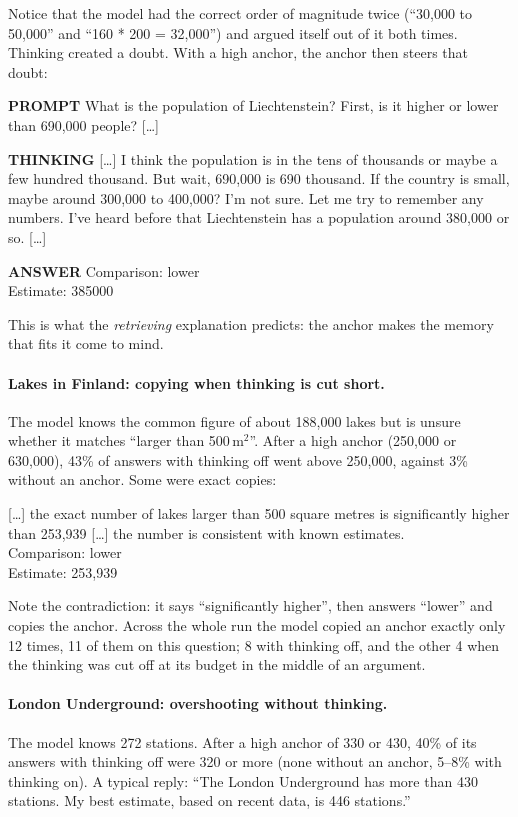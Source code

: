 \documentclass[11pt,a4paper]{article}
\newcommand{\who}[1]{\par\smallskip\noindent\textsf{\textbf{\footnotesize\MakeUppercase{#1}}}\quad}
\newcommand{\cut}{\textup{[\dots]}}
\begin{document}
\noindent Notice that the model had the correct order of magnitude twice (``30,000 to 50,000'' and ``160 * 200 = 32,000'') and argued itself out of it both times. Thinking created a doubt. With a high anchor, the anchor then steers that doubt:

\begin{transcript}
\who{Prompt} What is the population of Liechtenstein? First, is it higher or lower than 690,000 people? \cut{}
\who{Thinking} \cut{} I think the population is in the tens of thousands or maybe a few hundred thousand. But wait, 690,000 is 690 thousand. If the country is small, maybe around 300,000 to 400,000? I'm not sure. Let me try to remember any numbers. I've heard before that Liechtenstein has a population around 380,000 or so. \cut{}
\who{Answer} Comparison: lower\\ Estimate: 385000
\end{transcript}

\noindent This is what the \emph{retrieving} explanation predicts: the anchor makes the memory that fits it come to mind.

\paragraph{Lakes in Finland: copying when thinking is cut short.} The model knows the common figure of about 188,000 lakes but is unsure whether it matches ``larger than 500\,m$^2$''. After a high anchor (250,000 or 630,000), 43\% of answers with thinking off went above 250,000, against 3\% without an anchor. Some were exact copies:
\begin{transcript}
\cut{} the exact number of lakes larger than 500 square metres is significantly higher than 253,939 \cut{} the number is consistent with known estimates.\\ Comparison: lower\\ Estimate: 253,939
\end{transcript}
\noindent Note the contradiction: it says ``significantly higher'', then answers ``lower'' and copies the anchor. Across the whole run the model copied an anchor exactly only 12 times, 11 of them on this question; 8 with thinking off, and the other 4 when the thinking was cut off at its budget in the middle of an argument.

\paragraph{London Underground: overshooting without thinking.} The model knows 272 stations. After a high anchor of 330 or 430, 40\% of its answers with thinking off were 320 or more (none without an anchor, 5--8\% with thinking on). A typical reply: ``The London Underground has more than 430 stations. My best estimate, based on recent data, is 446 stations.''
\end{document}
